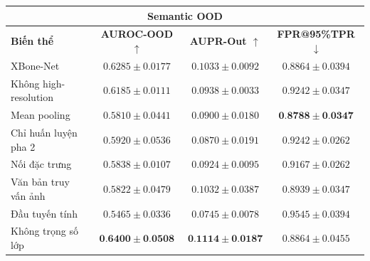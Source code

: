 \begin{table}[H]
\centering
\small
\setlength{\tabcolsep}{5pt}
\begin{tabular}{|l|c|c|c|}
\hline
\multicolumn{4}{|c|}{\textbf{Semantic OOD}} \\ \hline
\textbf{Biến thể} & \textbf{AUROC-OOD $\uparrow$} &
\textbf{AUPR-Out $\uparrow$} & \textbf{FPR@95\%TPR $\downarrow$} \\ \hline
\cellcolor{gray!12}XBone-Net &
\cellcolor{gray!12}$0{.}6285\pm0{.}0177$ &
\cellcolor{gray!12}$0{.}1033\pm0{.}0092$ &
\cellcolor{gray!12}$0{.}8864\pm0{.}0394$ \\ \hline
Không high-resolution &
$0{.}6185\pm0{.}0111$ & $0{.}0938\pm0{.}0033$ & $0{.}9242\pm0{.}0347$ \\ \hline
Mean pooling &
$0{.}5810\pm0{.}0441$ & $0{.}0900\pm0{.}0180$ & $\mathbf{0{.}8788\pm0{.}0347}$ \\ \hline
Chỉ huấn luyện pha 2 &
$0{.}5920\pm0{.}0536$ & $0{.}0870\pm0{.}0191$ & $0{.}9242\pm0{.}0262$ \\ \hline
Nối đặc trưng &
$0{.}5838\pm0{.}0107$ & $0{.}0924\pm0{.}0095$ & $0{.}9167\pm0{.}0262$ \\ \hline
Văn bản truy vấn ảnh &
$0{.}5822\pm0{.}0479$ & $0{.}1032\pm0{.}0387$ & $0{.}8939\pm0{.}0347$ \\ \hline
Đầu tuyến tính &
$0{.}5465\pm0{.}0336$ & $0{.}0745\pm0{.}0078$ & $0{.}9545\pm0{.}0394$ \\ \hline
Không trọng số lớp &
$\mathbf{0{.}6400\pm0{.}0508}$ & $\mathbf{0{.}1114\pm0{.}0187}$ & $0{.}8864\pm0{.}0455$ \\ \hline
\end{tabular}

\vspace{0.5em}


\end{table}
